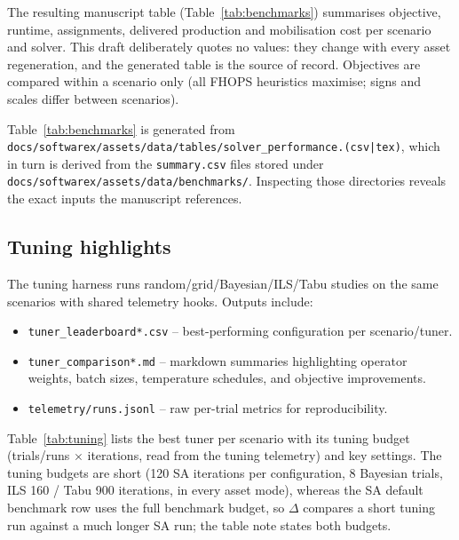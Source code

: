 The resulting manuscript table (Table~\ref{tab:benchmarks}) summarises objective, runtime, assignments, delivered production and mobilisation cost per scenario and solver. This draft deliberately quotes no values: they change with every asset regeneration, and the generated table is the source of record. Objectives are compared within a scenario only (all FHOPS heuristics maximise; signs and scales differ between scenarios).

\begin{table}[t]
  \centering
  \caption{Solver performance across the reference scenarios (all objectives are maximised; compare within a scenario).}
  \label{tab:benchmarks}
  
\end{table}
Table~\ref{tab:benchmarks} is generated from \texttt{docs/softwarex/assets/data/tables/solver\_performance.(csv|tex)}, which in turn is derived from the \texttt{summary.csv} files stored under \texttt{docs/softwarex/assets/data/benchmarks/}. Inspecting those directories reveals the exact inputs the manuscript references.

\subsection{Tuning highlights}
The tuning harness runs random/grid/Bayesian/ILS/Tabu studies on the same scenarios with shared telemetry hooks. Outputs include:
\begin{itemize}
  \item \texttt{tuner\_leaderboard*.csv} – best-performing configuration per scenario/tuner.
  \item \texttt{tuner\_comparison*.md} – markdown summaries highlighting operator weights, batch sizes, temperature schedules, and objective improvements.
  \item \texttt{telemetry/runs.jsonl} – raw per-trial metrics for reproducibility.
\end{itemize}

Table~\ref{tab:tuning} lists the best tuner per scenario with its tuning budget (trials/runs $\times$ iterations, read from the tuning telemetry) and key settings. The tuning budgets are short (120 SA iterations per configuration, 8 Bayesian trials, ILS 160 / Tabu 900 iterations, in every asset mode), whereas the SA default benchmark row uses the full benchmark budget, so $\Delta$ compares a short tuning run against a much longer SA run; the table note states both budgets.

